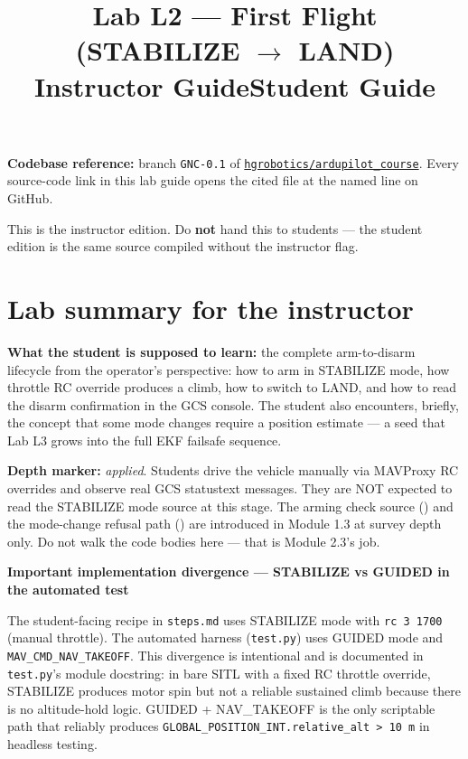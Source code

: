 \documentclass[a4paper,11pt,twoside]{article}
\title{Lab L2 --- First Flight (STABILIZE $\rightarrow$ LAND)\\
  \large \ifinstructor Instructor Guide\else Student Guide\fi}
\author{\copyrightline}
\date{}
\begin{document}
\maketitle

\noindent\textbf{Codebase reference:} branch \texttt{GNC-0.1} of \href{\repourl}{\nolinkurl{hgrobotics/ardupilot_course}}. Every source-code link in this lab guide opens the cited file at the named line on GitHub.

\bigskip

\ifinstructor

\begin{tcolorbox}[colback=red!5!white,colframe=red!40!black,title=Instructor edition]
This is the instructor edition. Do \textbf{not} hand this to students --- the student edition is the same source compiled without the instructor flag.
\end{tcolorbox}

\section*{Lab summary for the instructor}

\textbf{What the student is supposed to learn:} the complete arm-to-disarm lifecycle from the operator's perspective: how to arm in STABILIZE mode, how throttle RC override produces a climb, how to switch to LAND, and how to read the disarm confirmation in the GCS console. The student also encounters, briefly, the concept that some mode changes require a position estimate --- a seed that Lab L3 grows into the full EKF failsafe sequence.

\textbf{Depth marker:} \emph{applied}. Students drive the vehicle manually via MAVProxy RC overrides and observe real GCS statustext messages. They are NOT expected to read the STABILIZE mode source at this stage. The arming check source () and the mode-change refusal path () are introduced in Module 1.3 at survey depth only. Do not walk the code bodies here --- that is Module 2.3's job.

\textbf{Important implementation divergence --- STABILIZE vs GUIDED in the automated test}

The student-facing recipe in \texttt{steps.md} uses STABILIZE mode with \texttt{rc 3 1700} (manual throttle). The automated harness (\texttt{test.py}) uses GUIDED mode and \texttt{MAV\_CMD\_NAV\_TAKEOFF}. This divergence is intentional and is documented in \texttt{test.py}'s module docstring: in bare SITL with a fixed RC throttle override, STABILIZE produces motor spin but not a reliable sustained climb because there is no altitude-hold logic. GUIDED + NAV\_TAKEOFF is the only scriptable path that reliably produces \texttt{GLOBAL\_POSITION\_INT.relative\_alt > 10~m} in headless testing.
\end{document}
